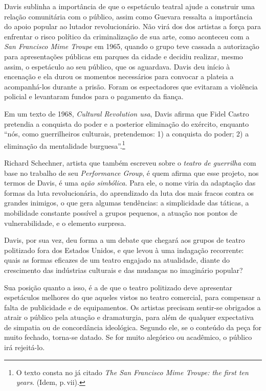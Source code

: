 Davis sublinha a importância de que o espetáculo teatral ajude a
construir uma relação comunitária com o público, assim como Guevara
ressalta a importância do apoio popular ao lutador revolucionário. Não
virá dos dos artistas a força para enfrentar o risco político da
criminalização de sua arte, como aconteceu com a {\it San Francisco Mime
Troupe} em 1965, quando o grupo teve cassada a autorização para
apresentações públicas em parques da cidade e decidiu realizar, mesmo
assim, o espetáculo ao seu público, que os aguardava. Davis deu início à
encenação e ela durou os momentos necessários para convocar a plateia a
acompanhá-los durante a prisão. Foram os espectadores que evitaram a
violência policial e levantaram fundos para o pagamento da fiança.

Em um texto de 1968, {\it Cultural Revolution {\sc usa}}, Davis afirma que
Fidel Castro pretendia a conquista do poder e a posterior eliminação do
exército, enquanto “nós, como guerrilheiros culturais, pretendemos: 1) a
conquista do poder; 2) a eliminação da mentalidade burguesa”.\footnote{O
  texto consta no já citado {\it The San Francisco Mime Troupe: the
  first ten years}. (Idem, p.\,vii).}

Richard Schechner, artista que também escreveu sobre o {\it teatro de
guerrilha} com base no trabalho de seu {\it Performance Group}, é quem
afirma que esse projeto, nos termos de Davis, é uma {\it ação
simbólica}. Para ele, o nome viria da adaptação das formas da luta
revolucionária, do aprendizado da luta dos mais fracos contra os grandes
inimigos, o que gera algumas tendências: a simplicidade das táticas, a
mobilidade constante possível a grupos pequenos, a atuação nos pontos de
vulnerabilidade, e o elemento surpresa.

Davis, por sua vez, deu forma a um debate que chegará aos grupos de
teatro politizado fora dos Estados Unidos, e que levou à uma indagação
recorrente: quais as formas eficazes de um teatro engajado na
atualidade, diante do crescimento das indústrias culturais e das
mudanças no imaginário popular?

Sua posição quanto a isso, é a de que o teatro politizado deve
apresentar espetáculos melhores do que aqueles vistos no teatro
comercial, para compensar a falta de publicidade e de equipamentos. Os
artistas precisam sentir-se obrigados a atrair o público pela atuação e
dramaturgia, para além de qualquer expectativa de simpatia ou de
concordância ideológica. Segundo ele, se o conteúdo da peça for muito
fechado, torna-se datado. Se for muito alegórico ou acadêmico, o público
irá rejeitá-lo.

